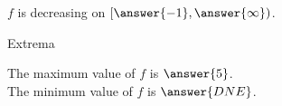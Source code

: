 \documentclass{ximera}
\begin{document}
\begin{exercise}
\begin{question}
$f$ is decreasing on $\left[ \answer{-1}, \answer{\infty} \right)$. \\

\end{question}









\begin{question} Extrema


The maximum value of $f$ is $\answer{5}$. \\

The minimum value of $f$ is $\answer{DNE}$. \\

\end{question}














\end{exercise}
\end{document}
